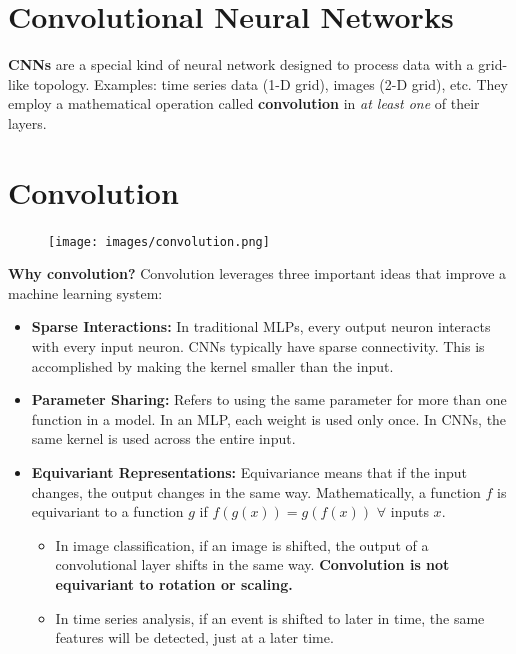 \section*{Convolutional Neural Networks}

\textbf{CNNs} are a special kind of neural network designed to process data with a grid-like topology. Examples: time series data (1-D grid), images (2-D grid), etc. They employ a mathematical operation called \textbf{convolution} in \textit{at least one} of their layers.

\section*{Convolution}

\begin{figure}[H]
  \texttt{[image: images/convolution.png]}
\end{figure}

\textbf{Why convolution?} Convolution leverages three important ideas that improve a machine learning system:

\begin{itemize}
  \item \textbf{Sparse Interactions:} In traditional MLPs, every output neuron interacts with every input neuron. CNNs typically have sparse connectivity. This is accomplished by making the kernel smaller than the input.
  \item \textbf{Parameter Sharing:} Refers to using the same parameter for more than one function in a model. In an MLP, each weight is used only once. In CNNs, the same kernel is used across the entire input. 

  \item \textbf{Equivariant Representations:} Equivariance means that if the input changes, the output changes in the same way. Mathematically, a function $f$ is equivariant to a function $g$ if $f(g(x)) = g(f(x))$ $\forall$ inputs $x$.
    \begin{itemize}
      \item In image classification, if an image is shifted, the output of a convolutional layer shifts in the same way. \textbf{Convolution is not equivariant to rotation or scaling.}
      \item In time series analysis, if an event is shifted to later in time, the same features will be detected, just at a later time.
    \end{itemize}
\end{itemize}

